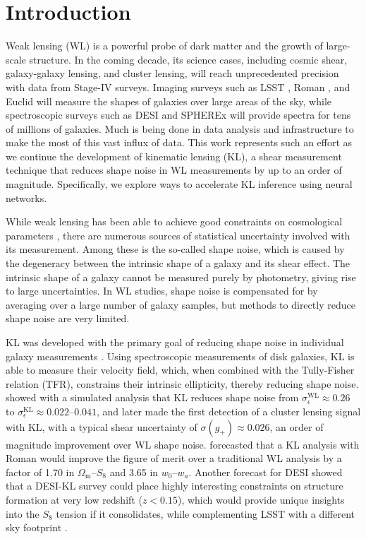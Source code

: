 \section{Introduction}
\label{sec:intro}

Weak lensing (WL) is a powerful probe of dark matter and the growth of large-scale structure. In the coming decade, its science cases, including cosmic shear, galaxy-galaxy lensing, and cluster lensing, will reach unprecedented precision with data from Stage-IV surveys. Imaging surveys such as LSST \citep{DESC_SRD}, Roman \citep{Roman_AFTA,HLIS-Multiprobe,HLIS-LSST}, and Euclid \citep{Euclid} will measure the shapes of galaxies over large areas of the sky, while spectroscopic surveys such as DESI \citep{DESI1,DESI2} and SPHEREx \citep{spherex} will provide spectra for tens of millions of galaxies. Much is being done in data analysis and infrastructure to make the most of this vast influx of data. This work represents such an effort as we continue the development of kinematic lensing (KL), a shear measurement technique that reduces shape noise in WL measurements by up to an order of magnitude. Specifically, we explore ways to accelerate KL inference using neural networks.

While weak lensing has been able to achieve good constraints on cosmological parameters \citep{DES_Y3_3x2pt, DESY6CS}, there are numerous sources of statistical uncertainty involved with its measurement. Among these is the so-called shape noise, which is caused by the degeneracy between the intrinsic shape of a galaxy and its shear effect. The intrinsic shape of a galaxy cannot be measured purely by photometry, giving rise to large uncertainties. In WL studies, shape noise is compensated for by averaging over a large number of galaxy samples, but methods to directly reduce shape noise are very limited.

KL was developed with the primary goal of reducing shape noise in individual galaxy measurements \citep{KL}. Using spectroscopic measurements of disk galaxies, KL is able to measure their velocity field, which, when combined with the Tully-Fisher relation (TFR), constrains their intrinsic ellipticity, thereby reducing shape noise. \citep{KLInferenceI} showed with a simulated analysis that KL reduces shape noise from $\sigma_\epsilon^\mathrm{WL}\approx0.26$ to $\sigma_\epsilon^\mathrm{KL}\approx0.022$--$0.041$, and \citep{KLCluster} later made the first detection of a cluster lensing signal with KL, with a typical shear uncertainty of $\sigma(g_+)\approx0.026$, an order of magnitude improvement over WL shape noise. \citep{KLRoman} forecasted that a KL analysis with Roman would improve the figure of merit over a traditional WL analysis by a factor of 1.70 in $\Omega_\mathrm{m}$--$S_8$ and 3.65 in $w_0$--$w_a$. Another forecast for DESI showed that a DESI-KL survey could place highly interesting constraints on structure formation at very low redshift ($z < 0.15$), which would provide unique insights into the $S_8$ tension if it consolidates, while complementing LSST with a different sky footprint \citep{KLDESI}.

